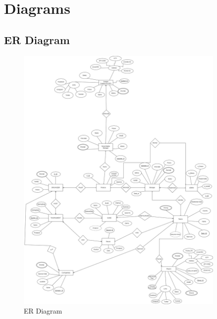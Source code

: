 \chapter{Diagrams}
\hrulefill


\section{ER Diagram}
\begin{figure}[h]
    \centering
    \includegraphics[width=0.9\textwidth]{diagrams/ER_ESPORTS_Diagram.png}
    \caption{ER Diagram}
    \label{fig:ER Diagram}
\end{figure}